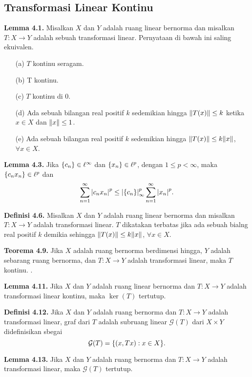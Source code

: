\documentclass{article}
\begin{document}
\begin{multicols}{2}
  \subsection*{Transformasi Linear Kontinu}
  \vspace{-1em}
  \textbf{Lemma 4.1.} Misalkan \(X\) dan \(Y\) adalah ruang linear bernorma dan misalkan \(T:X \to Y\) adalah sebuah transformasi linear. Pernyataan di bawah ini saling ekuivalen.
  \begin{itemize}
    \item[(a)] \(T\) kontinu seragam.
    \item[(b)] T kontinu.
    \item[(c)] \(T\) kontinu di \(0\).
    \item[(d)] Ada sebuah bilangan real positif \(k\) sedemikian hingga \(\norm{T(x)} \leq k\) ketika \(x \in X\) dan \(\norm{x} \leq 1\).
    \item[(e)] Ada sebuah bilangan real positif \(k\) sedemikian hingga \(\norm{T(x)} \leq k\norm{x}\), \(\forall x \in X\).
  \end{itemize}

  \textbf{Lemma 4.3.} Jika \(\qty{c_n} \in \ell^\infty\) dan \(\qty{x_n} \in \ell^p\), dengan \( 1 \leq p < \infty\), maka \(\qty{c_nx_n} \in \ell^p\) dan
  \[\sum_{n = 1}^\infty\abs{c_nx_n}^p \leq \abs{\qty{c_n}}_\infty^p \sum _{n=1}^\infty\abs{x_n}^p. \]

  \textbf{Definisi 4.6.} Misalkan \(X\) dan \(Y\) adalah ruang linear bernorma dan misalkan \(T:X\to Y\) adalah transformasi linear. \(T\) dikatakan terbatas jika ada sebuah bialng real positif \(k\) demikia sehingga \(\norm{T(x)} \leq k \norm{x}\), \(\forall x\in X\).

  \textbf{Teorema 4.9.} Jika \(X\) adalah ruang bernorma berdimensi hingga, \(Y\) adalah sebarang ruang bernorma, dan \(T: X\to Y\) adalah transformasi linear, maka \(T\) kontinu. .

  \textbf{Lemma 4.11.} Jika \(X\) dan \(Y\) adalah ruang linear bernorma dan \(T : X\to Y\) adalah transformasi linear kontinu, maka \(\ker(T)\) tertutup.

  \textbf{Definisi 4.12.} Jika \(X\) dan \(Y\) adalah ruang bernorma dan \(T: X\to Y\) adalah transformasi linear, graf dari \(T\) adalah subruang linear \(\mathcal{G}(T)\) dari \(X \times Y\) didefinisikan sbegai \[\mathcal{G}(T) = \qty{(x,Tx):x \in X}. \]

  \textbf{Lemma 4.13.} Jika \(X\) dan \(Y\) adalah ruang bernorma dan \(T:X\to Y \) adalah transformasi linear, maka \(\mathcal{G}(T)\) tertutup.


\end{multicols}
\end{document}
